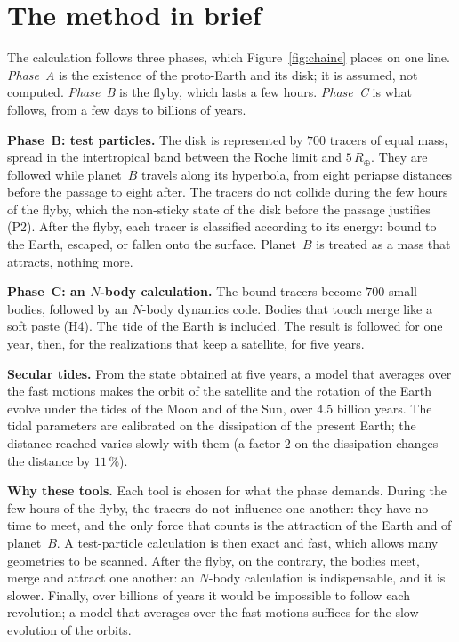 \documentclass[11pt,a4paper]{article}
\newcommand{\Rt}{\ensuremath{R_\oplus}}
\begin{document}
\section{The method in brief}
\label{sec:methode}

The calculation follows three phases, which Figure~\ref{fig:chaine} places on one line. \emph{Phase~A} is the existence of the proto-Earth and its disk; it is assumed, not computed. \emph{Phase~B} is the flyby, which lasts a few hours. \emph{Phase~C} is what follows, from a few days to billions of years.

\textbf{Phase~B: test particles.} The disk is represented by $700$ tracers of equal mass, spread in the intertropical band between the Roche limit and $5\,\Rt$. They are followed while planet~$B$ travels along its hyperbola, from eight periapse distances before the passage to eight after. The tracers do not collide during the few hours of the flyby, which the non-sticky state of the disk before the passage justifies (P2). After the flyby, each tracer is classified according to its energy: bound to the Earth, escaped, or fallen onto the surface. Planet~$B$ is treated as a mass that attracts, nothing more.

\textbf{Phase~C: an $N$-body calculation.} The bound tracers become $700$ small bodies, followed by an $N$-body dynamics code. Bodies that touch merge like a soft paste (H4). The tide of the Earth is included. The result is followed for one year, then, for the realizations that keep a satellite, for five years.

\textbf{Secular tides.} From the state obtained at five years, a model that averages over the fast motions makes the orbit of the satellite and the rotation of the Earth evolve under the tides of the Moon and of the Sun, over $4.5$ billion years. The tidal parameters are calibrated on the dissipation of the present Earth; the distance reached varies slowly with them (a factor $2$ on the dissipation changes the distance by $11\,\%$).

\textbf{Why these tools.} Each tool is chosen for what the phase demands. During the few hours of the flyby, the tracers do not influence one another: they have no time to meet, and the only force that counts is the attraction of the Earth and of planet~$B$. A test-particle calculation is then exact and fast, which allows many geometries to be scanned. After the flyby, on the contrary, the bodies meet, merge and attract one another: an $N$-body calculation is indispensable, and it is slower. Finally, over billions of years it would be impossible to follow each revolution; a model that averages over the fast motions suffices for the slow evolution of the orbits.
\end{document}
